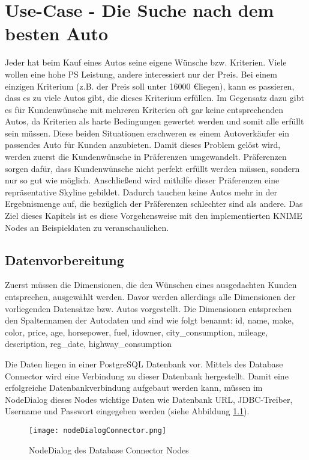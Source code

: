 \chapter{Use-Case - Die Suche nach dem besten Auto}
\label{ch:useCase}
Jeder hat beim Kauf eines Autos seine eigene Wünsche bzw. Kriterien. Viele wollen eine hohe PS Leistung, andere interessiert nur der Preis. Bei einem einzigen Kriterium (z.B. der Preis soll unter 16000 \euro liegen), kann es passieren, dass es zu viele Autos gibt, die dieses Kriterium erfüllen.
Im Gegensatz dazu gibt es für Kundenwünsche mit mehreren Kriterien oft gar keine entsprechenden Autos, da Kriterien als harte Bedingungen gewertet werden und somit alle erfüllt sein müssen. Diese beiden Situationen erschweren es einem Autoverkäufer ein passendes Auto für Kunden anzubieten. Damit dieses Problem gelöst wird, werden zuerst die Kundenwünsche in Präferenzen umgewandelt. Präferenzen sorgen dafür, dass Kundenwünsche nicht perfekt erfüllt werden müssen, sondern nur so gut wie möglich. Anschließend wird mithilfe dieser Präferenzen eine repräsentative Skyline gebildet. Dadurch tauchen keine Autos mehr in der Ergebnismenge auf, die bezüglich der Präferenzen schlechter sind als andere.
Das Ziel dieses Kapitels ist es diese Vorgehensweise mit den implementierten KNIME Nodes an Beispieldaten zu veranschaulichen.
\section{Datenvorbereitung}
\label{ch:Evaluierung:sec:vorbereitung}
Zuerst müssen die Dimensionen, die den Wünschen eines ausgedachten Kunden entsprechen, ausgewählt werden. Davor werden allerdings alle Dimensionen der vorliegenden Datensätze bzw. Autos vorgestellt. Die Dimensionen entsprechen den Spaltennamen der Autodaten und sind wie folgt benannt: id, name, make, color, price, age, horsepower, fuel, idowner, city_consumption, mileage, description, reg_date, highway_consumption

Die Daten liegen in einer PostgreSQL Datenbank vor. Mittels des Database Connector wird eine Verbindung zu dieser Datenbank hergestellt. Damit eine erfolgreiche Datenbankverbindung aufgebaut werden kann, müssen im NodeDialog dieses Nodes wichtige Daten wie Datenbank URL, JDBC-Treiber, Username und Passwort eingegeben werden (siehe Abbildung \ref{img:nodeDialogConnector}). 

\begin{figure}[H]
	\centering
	\texttt{[image: nodeDialogConnector.png]}
	\caption{NodeDialog des Database Connector Nodes}
	\label{img:nodeDialogConnector}
\end{figure} 


